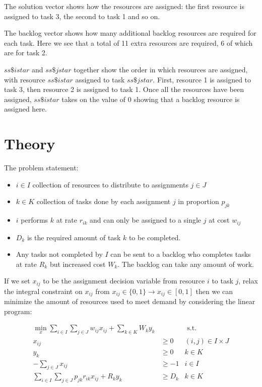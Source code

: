 \documentclass[12pt]{article}
\begin{document}
The solution vector shows how the resources are assigned: the first resource is assigned to task 3, the second to task 1 and so on.

The backlog vector shows how many additional backlog resources are required for each task. Here we see that a total of 11 extra resources are required, 6 of which are for task 2.

$ss\$istar$ and $ss\$jstar$ together show the order in which resources are assigned, with resource $ss\$istar$ assigned to task $ss\$jstar$. First, resource 1 is assigned to task 3, then resource 2 is assigned to task 1. Once all the resources have been assigned, $ss\$istar$ takes on the value of $0$ showing that a backlog resource is assigned here.

\section{Theory}
The problem statement:
\begin{itemize}
\item $i \in I$ collection of resources to distribute to assignments $j \in J$
\item $k \in K$ collection of tasks done by each assignment $j$ in proportion $p_{jk}$
\item $i$ performs $k$ at rate $r_{ik}$ and can only be assigned to a single $j$ at cost $w_{ij}$
\item $D_k$ is the required amount of task $k$ to be completed.
\item Any tasks not completed by $I$ can be sent to a backlog who completes tasks at rate $R_k$ but increased cost $W_k$. The backlog can take any amount of work.
\end{itemize}

If we set $x_{ij}$ to be the assignment decision variable from resource $i$ to task $j$, relax the integral constraint on $x_{ij}$ from $x_{ij} \in \{0,1\} \to x_{ij}\in [0,1]$ then we can minimize the amount of resources used to meet demand by considering the linear program:

\begin{align*}
\min_{x} \sum_{i \in I} \sum_{j \in J} w_{ij}  x_{ij}+\sum_{k \in K}W_ky_k && \text{ s.t. }\\
x_{ij} &\ge 0& (i,j) \in I \times J\\
y_k & \ge 0 & k \in K\\
-\sum_{j \in J} x_{ij} &\ge -1 &i \in I \\
\sum_{i \in I}\sum_{j \in J} p_{jk}r_{ik} x_{ij}+R_k y_k &\ge D_k & k \in K
\end{align*}
\end{document}
